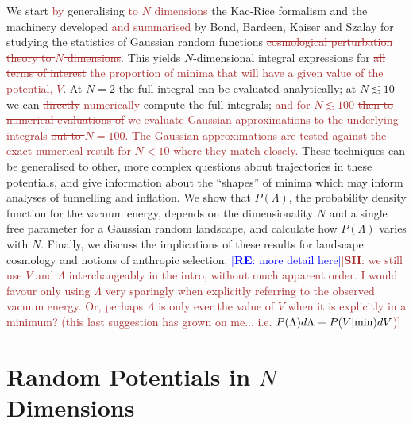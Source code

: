 \documentclass[12pt]{article}
\newcommand{\re}[1]{\textcolor{blue}{[{\bf RE}: #1]}}
\newcommand{\SH}[1]{\textcolor{brown}{[{\bf SH}: #1]}}
\newcommand{\sh}[1]{\textcolor{brown}{#1}}
\begin{document}
We start \sh{by} generalising \sh{to $N$ dimensions} the Kac-Rice formalism \cite{Kac1943,Rice1945} and the  machinery developed \sh{and summarised} by Bond, Bardeen, Kaiser and Szalay  \cite{BBKS}  for studying the statistics of Gaussian random functions \sh{\sout{ cosmological perturbation theory to $N$ dimensions}}. This yields $N$-dimensional integral expressions for \sh{\sout{all terms of interest} the proportion of minima that will have a given value of the potential, $V$}. At $N=2$ the full integral can be evaluated analytically; at $N \lesssim 10$ we can \sh{\sout{directly} numerically} compute the full integrals; \sh{and for $N \lesssim 100$ \sout{then to numerical evaluations of} we evaluate Gaussian approximations to the underlying integrals \sout{out to $N=100$}. The Gaussian approximations are tested against the exact numerical result for $N <10$ where they match closely.} These techniques can be generalised to other, more complex questions about trajectories in these potentials, and give information about the ``shapes'' of minima which may inform analyses of tunnelling and inflation. We show that $P(\Lambda)$, the probability density function for the vacuum energy, depends on the dimensionality $N$ and a single free parameter for a Gaussian random landscape, and calculate how $P(\Lambda)$ varies with $N$. Finally, we discuss the implications of these results for landscape cosmology and notions of anthropic selection. \re{more detail here}\SH{we still use $V$ and $\Lambda$ interchangeably in the intro, without much apparent order. I would favour only using $\Lambda$ very sparingly when explicitly referring to the observed vacuum energy. Or, perhaps $\Lambda$ is only ever the value of $V$ when it is explicitly in a minimum? (this last suggestion has grown on me... i.e. $P(\Lambda)d\Lambda \equiv P(V|{\rm min})dV$)}

\section{Random Potentials in $N$ Dimensions}

\end{document}
